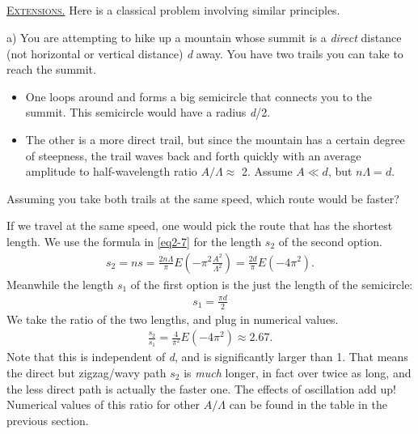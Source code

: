 \documentclass[11pt]{article}
\begin{document}
\subsection[Extensions]{} \textsc{\underline{Extensions.}} Here is a classical problem involving similar principles.

\vspace{10pt} a) You are attempting to hike up a mountain whose summit is a \textit{direct} distance (not horizontal or vertical distance) \textit{d} away. You have two trails you can take to reach the summit. 
\begin{itemize}
\item One loops around and forms a big semicircle that connects you to the summit. This semicircle would have a radius \textit{d}/2.
\item The other is a more direct trail, but since the mountain has a certain degree of steepness, the trail waves back and forth quickly with an average amplitude to half-wavelength ratio $A/\Lambda \approx$ 2. Assume $A \ll d$, but $n \Lambda = d$.
\end{itemize}
Assuming you take both trails at the same speed, which route would be faster?

\vspace{10pt} If we travel at the same speed, one would pick the route that has the shortest length. We use the formula in \eqref{eq2-7} for the length $s_2$ of the second option.
\begin{align} \label{eq2-9}
s_2 = ns = \frac{2n\Lambda}{\pi}E \left(-\pi^2 \frac{A^2}{\Lambda^2}\right) = \frac{2d}{\pi}E \left(-4\pi^2 \right).
\end{align}
Meanwhile the length $s_1$ of the first option is the just the length of the semicircle:
\begin{align} \label{eq2-10}
s_1 = \frac{\pi d}{2}
\end{align}
We take the ratio of the two lengths, and plug in numerical values.
\begin{align} \label{eq2-11}
\frac{s_2}{s_1} = \frac{4}{\pi^2}E \left(-4\pi^2 \right) \approx 2.67.
\end{align}
Note that this is independent of \textit{d}, and is significantly larger than 1. That means the direct but zigzag/wavy path $s_2$ is \textit{much} longer, in fact over twice as long, and the less direct path is actually the faster one. The effects of oscillation add up! Numerical values of this ratio for other $A/\Lambda$ can be found in the table in the previous section.
\end{document}
